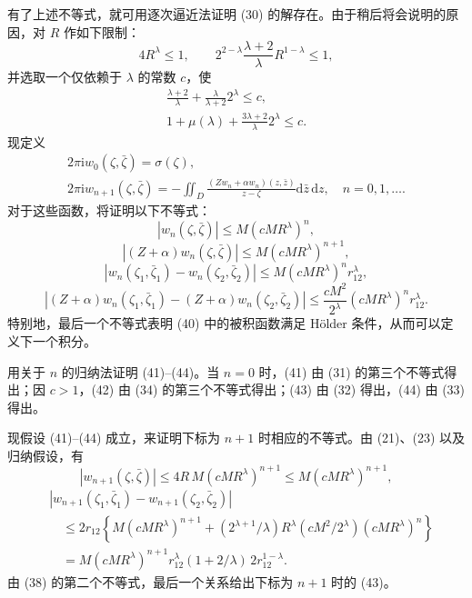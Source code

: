 \documentclass[UTF8,a4paper,11pt,fontset=fandol]{ctexart}
\newcommand{\dd}{\mathrm d}
\newcommand{\ii}{\mathrm i}
\newcommand{\dz}{\dd\bar z\,\dd z}
\newcommand{\zz}{\bar\zeta}
\begin{document}
有了上述不等式，就可用逐次逼近法证明 (30) 的解存在。由于稍后将会说明的原因，对 $R$ 作如下限制：
\begin{equation}4R^\lambda\le1,\qquad2^{2-\lambda}\frac{\lambda+2}\lambda R^{1-\lambda}\le1,\tag{38}\end{equation}
并选取一个仅依赖于 $\lambda$ 的常数 $c$，使
\begin{equation}\begin{gathered}\frac{\lambda+2}\lambda+\frac\lambda{\lambda+2}2^\lambda\le c,\\
1+\mu(\lambda)+\frac{3\lambda+2}\lambda2^\lambda\le c.
\end{gathered}\tag{39}\end{equation}
现定义
\begin{equation}\begin{gathered}2\pi\ii w_0(\zeta,\zz)=\sigma(\zeta),\\
2\pi\ii w_{n+1}(\zeta,\zz)=-\iint_D\frac{(Zw_n+\alpha w_n)(z,\bar z)}{z-\zeta}\dz,\quad n=0,1,\ldots.
\end{gathered}\tag{40}\end{equation}
对于这些函数，将证明以下不等式：
\begin{equation}|w_n(\zeta,\zz)|\le M(cMR^\lambda)^n,\tag{41}\end{equation}
\begin{equation}|(Z+\alpha)w_n(\zeta,\zz)|\le M(cMR^\lambda)^{n+1},\tag{42}\end{equation}
\begin{equation}|w_n(\zeta_1,\bar\zeta_1)-w_n(\zeta_2,\bar\zeta_2)|\le M(cMR^\lambda)^nr_{12}^\lambda,\tag{43}\end{equation}
\begin{equation}|(Z+\alpha)w_n(\zeta_1,\bar\zeta_1)-(Z+\alpha)w_n(\zeta_2,\bar\zeta_2)|
\le\frac{cM^2}{2^\lambda}(cMR^\lambda)^nr_{12}^\lambda.\tag{44}\end{equation}
特别地，最后一个不等式表明 (40) 中的被积函数满足 Hölder 条件，从而可以定义下一个积分。

用关于 $n$ 的归纳法证明 (41)--(44)。当 $n=0$ 时，(41) 由 (31) 的第三个不等式得出；因 $c>1$，(42) 由 (34) 的第三个不等式得出；(43) 由 (32) 得出，(44) 由 (33) 得出。

现假设 (41)--(44) 成立，来证明下标为 $n+1$ 时相应的不等式。由 (21)、(23) 以及归纳假设，有
\[|w_{n+1}(\zeta,\zz)|\le4R\,M(cMR^\lambda)^{n+1}\le M(cMR^\lambda)^{n+1},\]
\begin{align*}
&|w_{n+1}(\zeta_1,\bar\zeta_1)-w_{n+1}(\zeta_2,\bar\zeta_2)|\\
&\quad\le2r_{12}\left\{M(cMR^\lambda)^{n+1}+(2^{\lambda+1}/\lambda)R^\lambda(cM^2/2^\lambda)(cMR^\lambda)^n\right\}\\
&\quad=M(cMR^\lambda)^{n+1}r_{12}^\lambda(1+2/\lambda)\,2r_{12}^{1-\lambda}.
\end{align*}
由 (38) 的第二个不等式，最后一个关系给出下标为 $n+1$ 时的 (43)。
\end{document}

